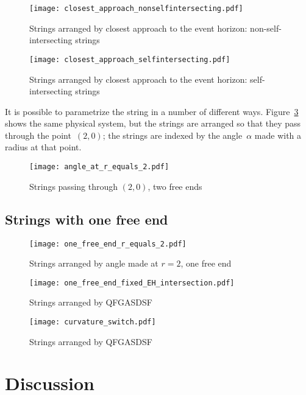 \documentclass[prb,preprint]{revtex4-1}
\begin{document}
\begin{figure}[h!]
\centering
\texttt{[image: closest\_approach\_nonselfintersecting.pdf]}
\caption{Strings arranged by closest approach to the event horizon:
  non-self-intersecting strings}
\label{closest_approach_non_self_intersecting}
\end{figure}

\begin{figure}[h!]
\centering
\texttt{[image: closest\_approach\_selfintersecting.pdf]}
\caption{Strings arranged by closest approach to the event horizon:
 self-intersecting strings}
\label{closest_approach_self_intersecting}
\end{figure}

It is possible to parametrize the string in a number of different
ways.  Figure~\ref{angle_at_r_equals_2} shows the same physical
system, but the strings are arranged so that they pass through the
point~$\left(2,0\right)$; the strings are indexed by the
angle~$\alpha$ made with a radius at that point.

\begin{figure}[h!]
\centering
\texttt{[image: angle\_at\_r\_equals\_2.pdf]}
\caption{Strings \label{angle_at_r_equals_2} passing through
  $\left(2,0\right)$, two free ends}
\end{figure}

\subsection{Strings with one free end}


\begin{figure}[h!]
\centering
\texttt{[image: one\_free\_end\_r\_equals\_2.pdf]}
\caption{Strings arranged by angle made at $r=2$, one free end}
\label{y}
\end{figure}

\begin{figure}[h!]
\centering
\texttt{[image: one\_free\_end\_fixed\_EH\_intersection.pdf]}
\caption{Strings arranged by QFGASDSF}
\label{fixed_EH_intersection}
\end{figure}

\begin{figure}[h!]
\centering
\texttt{[image: curvature\_switch.pdf]}
\caption{Strings arranged by QFGASDSF}
\label{curvature_switch}
\end{figure}



\section{Discussion}
\end{document}
